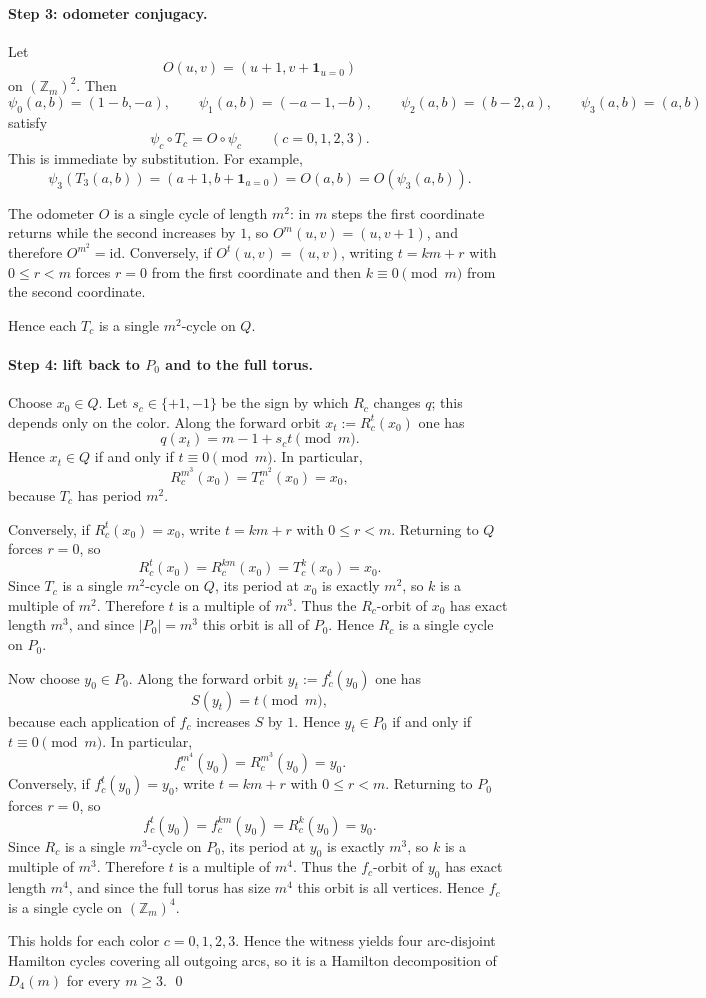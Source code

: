 \documentclass[11pt]{article}
\newcommand{\Zm}{\mathbb Z_m}
\newcommand{\I}{\mathbf 1}
\begin{document}
\paragraph{Step 3: odometer conjugacy.}
Let
\[
O(u,v)=(u+1,v+\I_{u=0})
\]
on $(\Zm)^2$. Then
\[
\psi_0(a,b)=(1-b,-a),
\qquad
\psi_1(a,b)=(-a-1,-b),
\qquad
\psi_2(a,b)=(b-2,a),
\qquad
\psi_3(a,b)=(a,b)
\]
satisfy
\[
\psi_c\circ T_c=O\circ \psi_c
\qquad(c=0,1,2,3).
\]
This is immediate by substitution. For example,
\[
\psi_3(T_3(a,b))=(a+1,b+\I_{a=0})=O(a,b)=O(\psi_3(a,b)).
\]

The odometer $O$ is a single cycle of length $m^2$: in $m$ steps the first coordinate returns while the second increases by $1$, so $O^m(u,v)=(u,v+1)$, and therefore $O^{m^2}=\mathrm{id}$. Conversely, if $O^t(u,v)=(u,v)$, writing $t=km+r$ with $0\le r<m$ forces $r=0$ from the first coordinate and then $k\equiv0\pmod m$ from the second coordinate.

Hence each $T_c$ is a single $m^2$-cycle on $Q$.

\paragraph{Step 4: lift back to $P_0$ and to the full torus.}
Choose $x_0\in Q$. Let $s_c\in\{+1,-1\}$ be the sign by which $R_c$ changes $q$; this depends only on the color. Along the forward orbit $x_t:=R_c^t(x_0)$ one has
\[
q(x_t)=m-1+s_c t \pmod m.
\]
Hence $x_t\in Q$ if and only if $t\equiv 0\pmod m$. In particular,
\[
R_c^{m^3}(x_0)=T_c^{m^2}(x_0)=x_0,
\]
because $T_c$ has period $m^2$.

Conversely, if $R_c^t(x_0)=x_0$, write $t=km+r$ with $0\le r<m$. Returning to $Q$ forces $r=0$, so
\[
R_c^{t}(x_0)=R_c^{km}(x_0)=T_c^k(x_0)=x_0.
\]
Since $T_c$ is a single $m^2$-cycle on $Q$, its period at $x_0$ is exactly $m^2$, so $k$ is a multiple of $m^2$. Therefore $t$ is a multiple of $m^3$. Thus the $R_c$-orbit of $x_0$ has exact length $m^3$, and since $|P_0|=m^3$ this orbit is all of $P_0$. Hence $R_c$ is a single cycle on $P_0$.

Now choose $y_0\in P_0$. Along the forward orbit $y_t:=f_c^t(y_0)$ one has
\[
S(y_t)=t \pmod m,
\]
because each application of $f_c$ increases $S$ by $1$. Hence $y_t\in P_0$ if and only if $t\equiv 0\pmod m$. In particular,
\[
f_c^{m^4}(y_0)=R_c^{m^3}(y_0)=y_0.
\]
Conversely, if $f_c^t(y_0)=y_0$, write $t=km+r$ with $0\le r<m$. Returning to $P_0$ forces $r=0$, so
\[
f_c^{t}(y_0)=f_c^{km}(y_0)=R_c^k(y_0)=y_0.
\]
Since $R_c$ is a single $m^3$-cycle on $P_0$, its period at $y_0$ is exactly $m^3$, so $k$ is a multiple of $m^3$. Therefore $t$ is a multiple of $m^4$. Thus the $f_c$-orbit of $y_0$ has exact length $m^4$, and since the full torus has size $m^4$ this orbit is all vertices. Hence $f_c$ is a single cycle on $(\Zm)^4$.

This holds for each color $c=0,1,2,3$. Hence the witness yields four arc-disjoint Hamilton cycles covering all outgoing arcs, so it is a Hamilton decomposition of $D_4(m)$ for every $m\ge 3$. \qed
\end{document}
